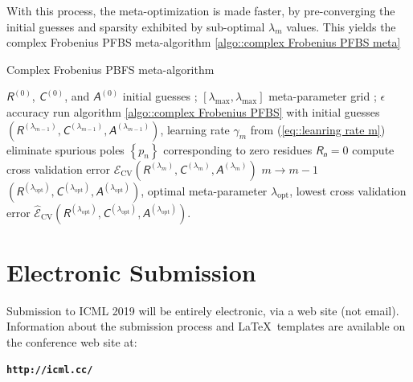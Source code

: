 \documentclass{article}
\newcommand{\mat}[1]{\bm{\mathsfit{#1}}}
\begin{document}
With this process, the meta-optimization is made faster, by pre-converging the initial guesses and sparsity exhibited by sub-optimal $\lambda_m$ values. This yields the complex Frobenius PFBS meta-algorithm \ref{algo::complex Frobenius PFBS meta}

\begin{algorithm}
    \caption{Complex Frobenius PBFS meta-algorithm}
    \label{algo::complex Frobenius PFBS meta}
    \begin{algorithmic}
         $\mat{R}^{(0)}$, $\mat{C}^{(0)}$, and $\mat{A}^{(0)}$ initial guesses ; $\left[ \lambda_{\text{max}}, \lambda_{\text{max}}\right]$ meta-parameter grid ; $\epsilon$ accuracy
        \WHILE{$\widehat{\mathcal{E}}_{\text{CV}}\left(\mat{R}^{(\lambda_{m - 1})} , \mat{C}^{(\lambda_{m-1})} , \mat{A}^{(\lambda_{m-1})} \right) \leq \widehat{\mathcal{E}}_{\text{CV}}\left(\mat{R}^{(\lambda_{m})} , \mat{C}^{(\lambda_{m})} , \mat{A}^{(\lambda_m)} \right)$}
            \STATE run algorithm \ref{algo::complex Frobenius PFBS} with initial guesses  $\left(\mat{R}^{(\lambda_{m - 1})} , \mat{C}^{(\lambda_{m-1})} , \mat{A}^{(\lambda_{m-1})} \right)$, learning rate $\gamma_m$ from (\ref{eq::leanring rate m})
            \STATE eliminate spurious poles $\left\{p_n\right\}$ corresponding to zero residues $\mat{R_n} = \mat{0}$
            \STATE compute cross validation error $ \widehat{\mathcal{E}}_{\text{CV}}\left(\mat{R}^{(\lambda_{m})} , \mat{C}^{(\lambda_{m})} , \mat{A}^{(\lambda_m)} \right)$
            \STATE $m \to m - 1$
        \ENDWHILE
         $\left( \mat{R}^{(\lambda_{\text{opt}})}, \mat{C}^{(\lambda_{\text{opt}})}, \mat{A}^{(\lambda_{\text{opt}})}\right)$, optimal meta-parameter $\lambda_{\text{opt}}$, lowest cross validation error $\widehat{\mathcal{E}}_{\text{CV}}\left( \mat{R}^{(\lambda_{\text{opt}})}, \mat{C}^{(\lambda_{\text{opt}})}, \mat{A}^{(\lambda_{\text{opt}})}\right)$.
    \end{algorithmic}
\end{algorithm}












\section{Electronic Submission}
\label{submission}

Submission to ICML 2019 will be entirely electronic, via a web site
(not email). Information about the submission process and \LaTeX\ templates
are available on the conference web site at:
\begin{center}
\textbf{\texttt{http://icml.cc/}}
\end{center}
\end{document}
